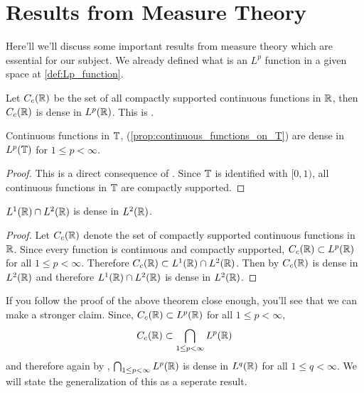 
\chapter{Results from Measure Theory}
Here'll we'll discuss some important results from measure theory which are essential for our subject. We already defined what is an $L^p$ function in a given space at \autoref{def:Lp_function}.

\begin{proposition}
\label{prop:compact_supported_cont_func_are_dense_in_Lp}
  Let $C_c(\mathbb R)$ be the set of all compactly supported continuous functions in $\mathbb R$, then $C_c(\mathbb R)$ is dense in $L^p(\mathbb R)$. This is \autocite[Theorem~3.14 \pno~69]{papaRudin}.
\end{proposition}

\begin{proposition}
  \label{prop:continuous_functions_in_T_are_dense_in_L1}
  Continuous functions in $\mathbb T$, (\autoref{prop:continuous_functions_on_T}) are dense in $L^p(\mathbb T)$ for $1\le p < \infty$.
\end{proposition}
\begin{proof}
  This is a direct consequence of \autocite[Theorem~3.14 on \pno~69]{papaRudin}. Since $\mathbb T$ is identified with $[0, 1)$, all continuous functions in $\mathbb T$ are compactly supported.
\end{proof}

\begin{proposition}
  \label{prop:L1_functions_are_dense_in_L2}
  $L^1(\mathbb R) \cap L^2(\mathbb R)$ is dense in $L^2(\mathbb R)$.
\end{proposition}
\begin{proof}
  Let $C_c(\mathbb R)$ denote the set of compactly supported continuous functions in $\mathbb R$. Since every function is continuous and compactly supported, $C_c(\mathbb R) \subset L^p(\mathbb R)$ for all $1\le p < \infty$. Therefore $C_c(\mathbb R) \subset L^1(\mathbb R) \cap L^2(\mathbb R)$. Then by \autocite[Theorem~3.14 on \pno~69]{papaRudin} $C_c(\mathbb R)$ is dense in $L^2(\mathbb R)$ and therefore $L^1(\mathbb R) \cap L^2(\mathbb R)$ is dense in $L^2(\mathbb R)$.
\end{proof}

If you follow the proof of the above theorem close enough, you'll see that we can make a stronger claim. Since, $C_c(\mathbb R) \subset L^p(\mathbb R)$ for all $1\le p < \infty$, $$C_c(\mathbb R) \subset \bigcap_{1\le p < \infty} L^p(\mathbb R)$$
and therefore again by \autocite[Theorem~3.14 on \pno~69]{papaRudin}, $\bigcap_{1\le p < \infty} L^p(\mathbb R)$ is dense in $L^q(\mathbb R)$ for all $1 \le q < \infty$. We will state the generalization of this as a seperate result.

